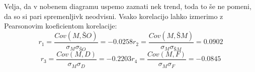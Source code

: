 \documentclass[a4paper,11pt]{article}
\begin{document}
\begin{figure}
    \centering
\end{figure}
Velja, da v nobenem diagramu uspemo zaznati nek trend, toda to še ne pomeni, da so si pari spremenljivk neodvisni. Vsako korelacijo lahko izmerimo z Pearsonovim koeficientom korelacije:
\[r_1 = \frac{Cov(M,ŠO)}{\sigma_{M} \sigma_{ŠO}} = -0.0258 r_2 = \frac{Cov(M,ŠM)}{\sigma_{M} \sigma_{ŠM}} = 0.0902\]
\[r_3 = \frac{Cov(M,D)}{\sigma_{M} \sigma_{D}} = -0.2203 r_4 = \frac{Cov(M,F)}{\sigma_{M} \sigma_{F}} = -0.0845\]
\end{document}
